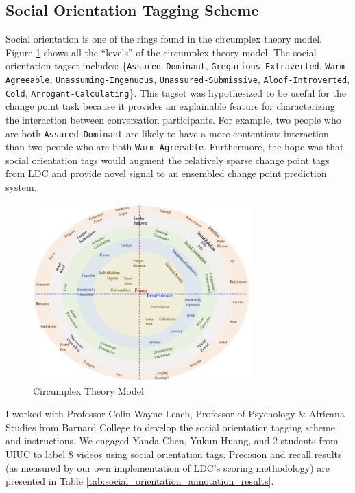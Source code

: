 \documentclass[12pt]{article}
\begin{document}
\subsection{Social Orientation Tagging Scheme}
Social orientation is one of the rings found in the circumplex theory model. Figure \ref{fig:circumplex} shows all the ``levels'' of the circumplex theory model. The social orientation tagset includes: \{\verb|Assured-Dominant|, \verb|Gregarious-Extraverted|, \verb|Warm-Agreeable|, \verb|Unassuming-Ingenuous|, \verb|Unassured-Submissive|, \verb|Aloof-Introverted|, \verb|Cold|, \verb|Arrogant-Calculating|\}. This tagset was hypothesized to be useful for the change point task because it provides an explainable feature for characterizing the interaction between conversation participants. For example, two people who are both \verb|Assured-Dominant| are likely to have a more contentious interaction than two people who are both \verb|Warm-Agreeable|. Furthermore, the hope was that social orientation tags would augment the relatively sparse change point tags from LDC and provide novel signal to an ensembled change point prediction system.

\begin{figure}[H]
    \centering
    \includegraphics[width=0.75\textwidth]{./analysis/circumplex.png}
    \caption{Circumplex Theory Model}
    \label{fig:circumplex}
\end{figure}

I worked with Professor Colin Wayne Leach, Professor of Psychology \& Africana Studies from Barnard College to develop the social orientation tagging scheme and instructions. We engaged Yanda Chen, Yukun Huang, and 2 students from UIUC to label 8 videos using social orientation tags. Precision and recall results (as measured by our own implementation of LDC's scoring methodology) are presented in Table \ref{tab:social_orientation_annotation_results}.
\end{document}
